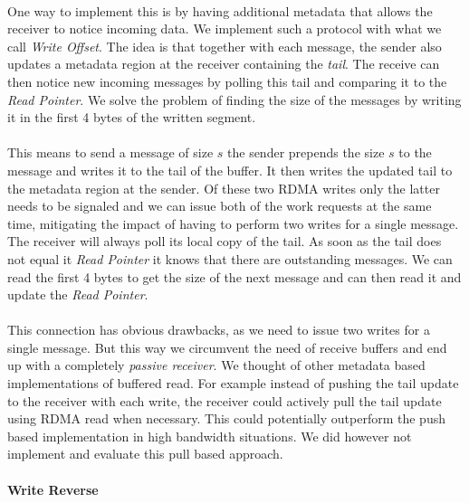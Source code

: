 \paragraph{} One way to implement this is by having additional metadata that allows the receiver to notice incoming data.
We implement such a protocol with what we call \emph{Write Offset}. The idea is that together with each message, the sender
also updates a metadata region at the receiver containing the \emph{tail}. The receive can then notice new incoming messages
by polling this tail and comparing it to the \emph{Read Pointer}. We solve the problem of finding the size of the messages by
writing it in the first 4 bytes of the written segment.

\paragraph{} This means to send a message of size $s$ the sender prepends the size $s$ to the message and writes it to the
tail of the buffer. It then writes the updated tail to the metadata region at the sender. Of these two RDMA writes only the 
latter needs to be signaled and we can issue both of the work requests at the same time, mitigating the impact of having to 
perform two writes for a single message. The receiver will always poll its local copy of the tail. As soon as the tail does 
not equal it \emph{Read Pointer} it knows that there are outstanding messages. We can read the first 4 bytes to get the size
of the next message and can then read it and update the \emph{Read Pointer}.

\paragraph{} This connection has obvious drawbacks, as we need to issue two writes for a single message. But this way we 
circumvent the need of receive buffers and end up with a completely \emph{passive receiver}. We thought of other metadata
based implementations of buffered read. For example instead of pushing the tail update to the receiver with each write, the
receiver could actively pull the tail update using RDMA read when necessary. This could potentially outperform the push based
implementation in high bandwidth situations. We did however not implement and evaluate this pull based approach.


\paragraph{Write Reverse}


